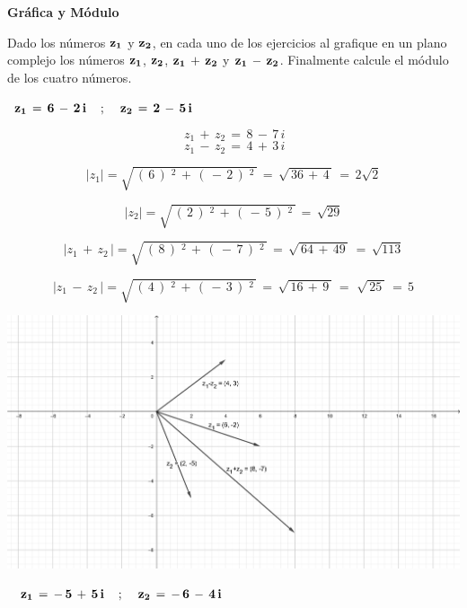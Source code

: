\documentclass[a4paper,11pt,openany]{book}
\begin{document}
\newpage


\begin{center}
\textbf{Gráfica y Módulo}
\end{center}

Dado los números $\bf{z_{1}}$ y $\bf{z_{2}}$, en cada uno de los ejercicios  al  grafique en un plano complejo los números $\bf{z_{1}}$, $\bf{z_{2}}$, $\bf{z_{1}\,+\,z_{2}}$ y $\bf{z_{1}\,-\,z_{2}}$. Finalmente calcule el módulo de los cuatro números.\\

\providecommand{\abs}[1]{\lvert#1\rvert} 
\graphicspath{ {images/} }




\textcolor{ao(english)}{}\,\quad\,$\bf{z_{1}\,=\,6\,-\,2\,i \quad\,;\,\quad z_{2}\,=\,2\,-\,5\,i}$

$$\,{z_1}\,+\,{z_2}\,=\,8\,-\,7\,i$$
$$\,{z_1}\,-\,{z_2}\,=\,4\,+\,3\,i$$

$$\abs{z_1} = \sqrt{\,(\,6\,)\,^{\,2}\,+\,(\,-\,2\,)\,^{\,2}\,}\,=\,\sqrt{\,36\,+\,4\,}\,=\,\boxed{2\sqrt{2}}$$

$$\abs{z_2} = \sqrt{\,(\,2\,)\,^{\,2}\,+\,(\,-\,5\,)\,^{\,2}\,}\,=\,\boxed{\sqrt{29}}$$

$$\abs{z_1\,+\,{z_2}\,} = \sqrt{\,(\,8\,)\,^{\,2}\,+\,(\,-\,7\,)\,^{\,2}\,}\,=\,\sqrt{\,64\,+\,49\,}\,=\,\boxed{\sqrt{113}}$$

$$\abs{z_1\,-\,{z_2}\,} = \sqrt{\,(\,4\,)\,^{\,2}\,+\,(\,-\,3\,)\,^{\,2}\,}\,=\,\sqrt{\,16\,+\,9\,}\,=\,\,\sqrt{\,25\,}\,=\,\boxed{5}$$

\includegraphics[width=15cm]{geo1}

\
\textcolor{ao(english)}{}\,\quad\,$\bf{z_{1}\,=\,-\,5\,+\,5\,i \quad\,;\,\quad z_{2}\,=\,-\,6\,-\,4\,i}$
\end{document}
